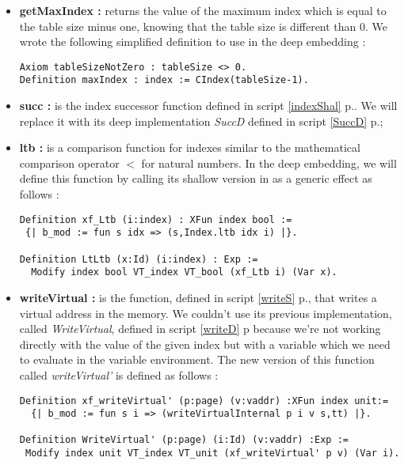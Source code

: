 \begin{itemize}
	\item\textbf{getMaxIndex :} returns the value of the maximum index which is equal to the table size minus one, knowing that the table size is different than 0. We wrote the following simplified definition to use in the deep embedding : 
\begin{lstlisting}[caption = {Maximum index}, xleftmargin=.01\textwidth,
xrightmargin=.01\textwidth,mathescape=true]
Axiom tableSizeNotZero : tableSize <> 0.
Definition maxIndex : index := CIndex(tableSize-1). 
\end{lstlisting} \vspace{4pt}
	\item \textbf{succ :} is the index successor function defined in script \ref{indexShal} p.\pageref{indexShal}. We will replace it with its deep implementation \textit{SuccD} defined in script \ref{SuccD} p.\pageref{SuccD};
	\item \textbf{ltb :} is a comparison function for indexes similar to the mathematical comparison operator $<$ for natural numbers. In the deep embedding, we will define this function by calling its shallow version in as a generic effect as follows :
\begin{lstlisting}[caption = {LtLtb definition}, xleftmargin=-.05\textwidth,
xrightmargin=-.01\textwidth,mathescape=true]
Definition xf_Ltb (i:index) : XFun index bool := 
 {| b_mod := fun s idx => (s,Index.ltb idx i) |}.

Definition LtLtb (x:Id) (i:index) : Exp :=
  Modify index bool VT_index VT_bool (xf_Ltb i) (Var x). 
\end{lstlisting} 	
	\item \textbf{writeVirtual :} is the function, defined in script \ref{writeS} p.\pageref{writeS}, that writes a virtual address in the memory. We couldn't use its previous implementation, called \textit{WriteVirtual}, defined in script \ref{writeD} p\pageref{writeD} because we're not working directly with the value of the given index but with a variable which we need to evaluate in the variable environment. The new version of this function called \textit{writeVirtual'} is defined as follows :
\begin{lstlisting}[caption = {writeVirtual new definition}, xleftmargin=-.15\textwidth,
xrightmargin=-.11\textwidth,mathescape=true]
Definition xf_writeVirtual' (p:page) (v:vaddr) :XFun index unit:= 
  {| b_mod := fun s i => (writeVirtualInternal p i v s,tt) |}.
 
Definition WriteVirtual' (p:page) (i:Id) (v:vaddr) :Exp :=
 Modify index unit VT_index VT_unit (xf_writeVirtual' p v) (Var i).
\end{lstlisting} 
\end{itemize}

